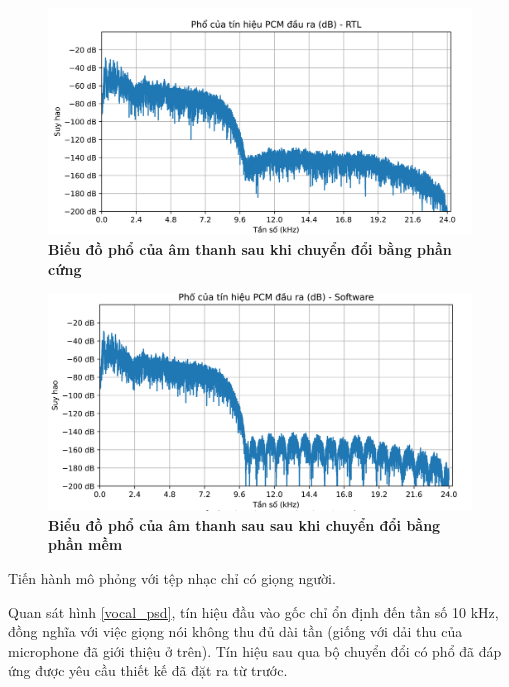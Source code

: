 \begin{figure}[H]
    \centering
    \includegraphics[width=13cm]{Images/Chuong4/tb/wav/vldd2_psd_0.png}
    \caption[Biểu đồ phổ của âm thanh sau khi chuyển đổi bằng phần cứng]{\bfseries \fontsize{12pt}{0pt}\selectfont  Biểu đồ phổ của âm thanh sau khi chuyển đổi bằng phần cứng}
    \label{vldd2_psd_0}
\end{figure}

\begin{figure}[H]
    \centering
    \includegraphics[width=13cm]{Images/Chuong4/tb/wav/vldd2_psd_1.png}
    \caption[Biểu đồ phổ của âm thanh sau sau khi chuyển đổi bằng phần mềm]{\bfseries \fontsize{12pt}{0pt}\selectfont  Biểu đồ phổ của âm thanh sau sau khi chuyển đổi bằng phần mềm}
    \label{vldd2_psd_1}
\end{figure}

Tiến hành mô phỏng với tệp nhạc chỉ có giọng người.

Quan sát hình \ref{vocal_psd}, tín hiệu đầu vào gốc chỉ ổn định đến tần số 10 kHz, đồng nghĩa với việc giọng nói không thu đủ dài tần (giống với dải thu của microphone đã giới thiệu ở trên). Tín hiệu sau qua bộ chuyển đổi có phổ đã đáp ứng được yêu cầu thiết kế đã đặt ra từ trước.

